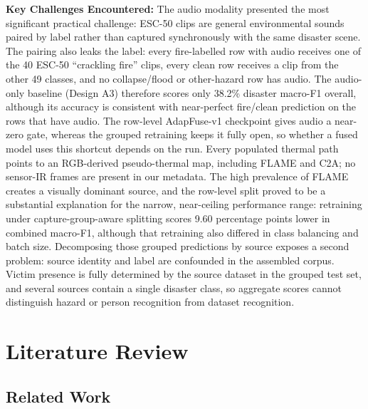 \documentclass[journal]{IEEEtran}
\begin{document}
\textbf{Key Challenges Encountered:}
The audio modality presented the most significant practical challenge: ESC-50 clips are general environmental sounds paired by label rather than captured synchronously with the same disaster scene. The pairing also leaks the label: every fire-labelled row with audio receives one of the 40 ESC-50 ``crackling fire'' clips, every clean row receives a clip from the other 49 classes, and no collapse/flood or other-hazard row has audio. The audio-only baseline (Design A3) therefore scores only 38.2\% disaster macro-F1 overall, although its accuracy is consistent with near-perfect fire/clean prediction on the rows that have audio. The row-level AdapFuse-v1 checkpoint gives audio a near-zero gate, whereas the grouped retraining keeps it fully open, so whether a fused model uses this shortcut depends on the run. Every populated thermal path points to an RGB-derived pseudo-thermal map, including FLAME and C2A; no sensor-IR frames are present in our metadata. The high prevalence of FLAME creates a visually dominant source, and the row-level split proved to be a substantial explanation for the narrow, near-ceiling performance range: retraining under capture-group-aware splitting scores 9.60 percentage points lower in combined macro-F1, although that retraining also differed in class balancing and batch size. Decomposing those grouped predictions by source exposes a second problem: source identity and label are confounded in the assembled corpus. Victim presence is fully determined by the source dataset in the grouped test set, and several sources contain a single disaster class, so aggregate scores cannot distinguish hazard or person recognition from dataset recognition.


\section{Literature Review}


\subsection{Related Work}
\end{document}
